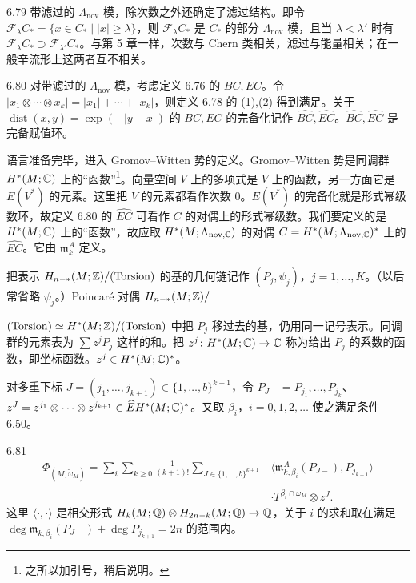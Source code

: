 \begin{remark}{6.79}
  带滤过的 $\Lambda_{\mathrm{nov}}$ 模，除次数之外还确定了滤过结构。即令 $\mathcal{F}_\lambda C_*=\{x\in C_*\mid|x|\ge\lambda\}$，则 $\mathcal{F}_\lambda C_*$ 是 $C_*$ 的部分 $\Lambda_{\mathrm{nov}}$ 模，且当 $\lambda<\lambda'$ 时有 $\mathcal{F}_\lambda C_*\supset\mathcal{F}_{\lambda'}C_*$。与第 5 章一样，次数与 Chern 类相关，滤过与能量相关；在一般辛流形上这两者互不相关。
\end{remark}

\begin{definition}{6.80}
  对带滤过的 $\Lambda_{\mathrm{nov}}$ 模，考虑定义 6.76 的 $BC,EC$。令 $|x_1\otimes\cdots\otimes x_k|=|x_1|+\cdots+|x_k|$，则定义 6.78 的 (1),(2) 得到满足。关于 $\operatorname{dist}(x,y)=\exp(-|y-x|)$ 的 $BC,EC$ 的完备化记作 $\widehat{BC},\widehat{EC}$。$\widehat{BC},\widehat{EC}$ 是完备赋值环。
\end{definition}

语言准备完毕，进入 Gromov–Witten 势的定义。Gromov–Witten 势是同调群 $H^*(M;\mathbb{C})$ 上的“函数”\footnote{之所以加引号，稍后说明。}。向量空间 $V$ 上的多项式是 $V$ 上的函数，另一方面它是 $E(V^*)$ 的元素。这里把 $V$ 的元素都看作次数 $0$。$E(V^*)$ 的完备化就是形式幂级数环，故定义 6.80 的 $\widehat{EC}$ 可看作 $C$ 的对偶上的形式幂级数。我们要定义的是 $H^*(M;\mathbb{C})$ 上的“函数”，故应取 $H^*(M;\Lambda_{\mathrm{nov},\mathbb{C}})$ 的对偶 $C=H^*(M;\Lambda_{\mathrm{nov},\mathbb{C}})^*$ 上的 $\widehat{EC}$。它由 $\mathfrak{m}_k^A$ 定义。

把表示 $H_{n-*}(M;\mathbb{Z})/(\operatorname{Torsion})$ 的基的几何链记作 $(P_j,\psi_j)$，$j=1,\dots,K$。（以后常省略 $\psi_j$。）Poincaré 对偶 $H_{n-*}(M;\mathbb{Z})/$

$(\operatorname{Torsion})\simeq H^*(M;\mathbb{Z})/(\operatorname{Torsion})$ 中把 $P_j$ 移过去的基，仍用同一记号表示。同调群的元素表为 $\sum z^jP_j$ 这样的和。把 $z^j\colon H^*(M;\mathbb{C})\to\mathbb{C}$ 称为给出 $P_j$ 的系数的函数，即坐标函数。$z^j\in H^*(M;\mathbb{C})^*$。

对多重下标 $J=(j_1,\dots,j_{k+1})\in\{1,\dots,b\}^{k+1}$，令 $P_{J-}=P_{j_1},\dots,P_{j_k}$、$z^J=z^{j_1}\otimes\cdots\otimes z^{j_{k+1}}\in\widehat{E}H^*(M;\mathbb{C})^*$。又取 $\beta_i$，$i=0,1,2,\dots$ 使之满足条件 6.50。

\begin{definition}{6.81}
  \[
  \begin{aligned}
    \Phi_{(M,\tilde\omega_M)}
    =\sum_i\sum_{k\ge0}\frac{1}{(k+1)!}
    \sum_{J\in\{1,\dots,b\}^{k+1}}
    &\big\langle\mathfrak{m}_{k,\beta_i}^A(P_{J-}),P_{j_{k+1}}\big\rangle\\
    &\cdot T^{\beta_i\cap\tilde\omega_M}\otimes z^J .
  \end{aligned}
  \]
  这里 $\langle\cdot,\cdot\rangle$ 是相交形式 $H_k(M;\mathbb{Q})\otimes H_{2n-k}(M;\mathbb{Q})\to\mathbb{Q}$，关于 $i$ 的求和取在满足 $\deg\mathfrak{m}_{k,\beta_i}(P_{J-})+\deg P_{j_{k+1}}=2n$ 的范围内。
\end{definition}

